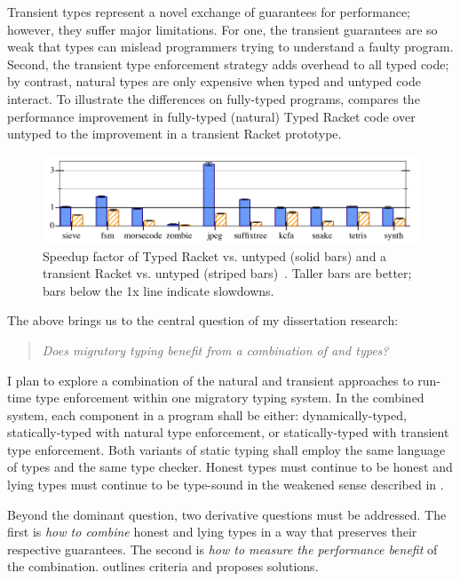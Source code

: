 Transient types represent a novel exchange of guarantees for performance;
 however, they suffer major limitations.
For one, the transient guarantees are so weak that types can mislead
 programmers trying to understand a faulty program.
Second, the transient type enforcement strategy adds overhead to all typed code;
 by contrast, natural types are only expensive when typed and untyped code interact.
To illustrate the differences on fully-typed programs,
  compares the performance improvement
 in fully-typed (natural) Typed Racket code over untyped to the improvement in a
 transient Racket prototype.

\begin{figure}[h]
  \includegraphics[width=0.8\columnwidth]{src/icfp-bars.png}
  \caption{Speedup factor of Typed Racket vs. untyped (solid bars) and a transient Racket vs. untyped (striped bars)~\cite{gf-icfp-2018}.
           Taller bars are better; bars below the 1x line indicate slowdowns.}
  \label{fig:icfp-bars}
\end{figure}

\noindent
The above brings us to the central question of my dissertation research:

\begin{quote}
  \emph{Does migratory typing benefit from a combination of \tdeep{} and \tshallow{} types?}
\end{quote}

I plan to explore a combination of the natural and transient approaches to
 run-time type enforcement within one migratory typing system.
In the combined system, each component in a program shall be either:
 dynamically-typed,
 statically-typed with natural type enforcement,
 or statically-typed with transient type enforcement.
Both variants of static typing shall employ the same language of types and the
 same type checker.
Honest types must continue to be honest
 and lying types must continue to be type-sound
 in the weakened sense described in .

Beyond the dominant question, two derivative questions must be addressed.
The first is \emph{how to combine}\/ honest and lying
 types in a way that preserves their respective guarantees.
The second is \emph{how to measure the performance benefit}\/ of the combination.
 outlines criteria and proposes solutions.

